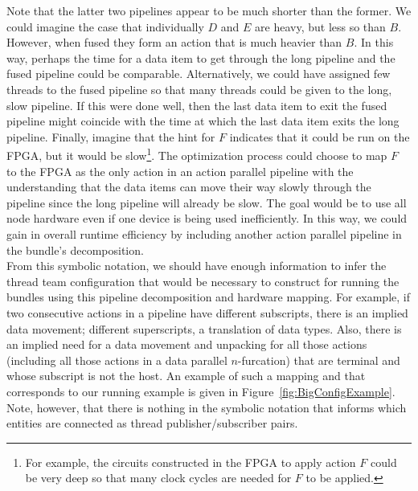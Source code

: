 \documentclass{article}
\begin{document}
Note that the latter two pipelines appear to be much shorter than the
former.  We could imagine the case that individually $D$ and $E$ are heavy, but
less so than $B$.  However, when fused they form an action that is much heavier
than $B$.  In this way, perhaps the time for a data item to get through the long
pipeline and the fused pipeline could be comparable.  Alternatively, we could
have assigned few threads to the fused pipeline so that many threads could be
given to the long, slow pipeline.  If this were done well, then the last data
item to exit the fused pipeline might coincide with the time at which the last
data item exits the long pipeline.  Finally, imagine that the hint for $F$
indicates that it could be run on the FPGA, but it would be slow\footnote{For
example, the circuits constructed in the FPGA to apply action $F$ could be very
deep so that many clock cycles are needed for $F$ to be applied.}.  The
optimization process could choose to map $F$ to the FPGA as the only action in
an action parallel pipeline with the understanding that the data items can move
their way slowly through the pipeline since the long pipeline will already be
slow.  The goal would be to use all node hardware even if one device is being
used inefficiently.  In this way, we could gain in overall runtime efficiency by
including another action parallel pipeline in the bundle's decomposition.\\

From this symbolic notation, we should have enough information to infer the
thread team configuration that would be necessary to construct for running the
bundles using this pipeline decomposition and hardware mapping.  For example, if
two consecutive actions in a pipeline have different subscripts, there is an
implied data movement; different superscripts, a translation of data types.
Also, there is an implied need for a data movement and unpacking for all those
actions (including all those actions in a data parallel $n$-furcation) that are
terminal and whose subscript is not the host.  An example of such a mapping and
that
corresponds to our running example is given in
Figure~\ref{fig:BigConfigExample}.  Note, however, that there is nothing in the
symbolic notation that informs which entities are connected as thread
publisher/subscriber pairs.\\
\end{document}
